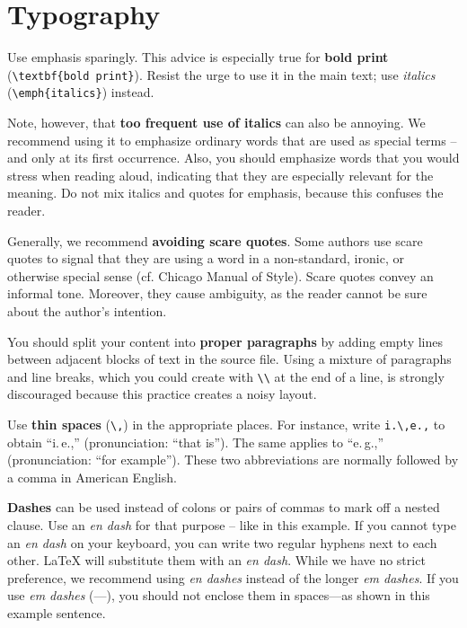 \section{Typography}

Use emphasis sparingly. This advice is especially true for \textbf{bold print} (\verb|\textbf{bold print}|).%
Resist the urge to use it in the main text; use \emph{italics} (\verb|\emph{italics}|) instead.

Note, however, that \textbf{too frequent use of italics} can also be annoying.
We recommend using it to emphasize ordinary words that are used as special terms – and only at its first occurrence. Also, you should emphasize words that you would stress when reading aloud, indicating that they are especially relevant for the meaning. Do not mix italics and quotes for emphasis, because this confuses the reader.


Generally, we recommend \textbf{avoiding scare quotes}.%
Some authors use scare quotes to signal that they are using a word in a non-standard, ironic, or otherwise special sense (cf. Chicago Manual of Style). Scare quotes convey an informal tone. Moreover, they cause ambiguity, as the reader cannot be sure about the author's intention.

You should split your content into \textbf{proper paragraphs} by adding empty lines between adjacent blocks of text in the source file. Using a mixture of paragraphs and line breaks, which you could create with \verb|\\| at the end of a line, is strongly discouraged because this practice creates a noisy layout.

Use \textbf{thin spaces} (\verb|\,|) in the appropriate places. For instance, write \verb|i.\,e.,| to obtain ``i.\,e.,'' (pronunciation: ``that is''). The same applies to ``e.\,g.,'' (pronunciation: ``for example''). These two abbreviations are normally followed by a comma in American English.

\textbf{Dashes} can be used instead of colons or pairs of commas to mark off a nested clause. Use an \emph{en dash} for that purpose -- like in this example. If you cannot type an \emph{en dash} on your keyboard, you can write two regular hyphens next to each other. LaTeX will substitute them with an \emph{en dash}. While we have no strict preference, we recommend using \emph{en dashes} instead of the longer \emph{em dashes}. If you use \emph{em dashes} (---), you should not enclose them in spaces---as shown in this example sentence.

